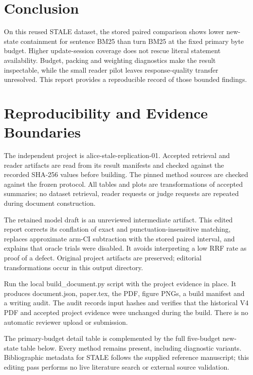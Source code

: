 \documentclass{article}
\begin{document}
\section{Conclusion}
On this reused STALE dataset, the stored paired comparison shows lower new-state containment for sentence BM25 than turn BM25 at the fixed primary byte budget. Higher update-session coverage does not rescue literal statement availability. Budget, packing and weighting diagnostics make the result inspectable, while the small reader pilot leaves response-quality transfer unresolved. This report provides a reproducible record of those bounded findings.

\appendix
\section{Reproducibility and Evidence Boundaries}
The independent project is alice-stale-replication-01. Accepted retrieval and reader artifacts are read from its result manifests and checked against the recorded SHA-256 values before building. The pinned method sources are checked against the frozen protocol. All tables and plots are transformations of accepted summaries; no dataset retrieval, reader requests or judge requests are repeated during document construction.

The retained model draft is an unreviewed intermediate artifact. This edited report corrects its conflation of exact and punctuation-insensitive matching, replaces approximate arm-CI subtraction with the stored paired interval, and explains that oracle trials were disabled. It avoids interpreting a low RRF rate as proof of a defect. Original project artifacts are preserved; editorial transformations occur in this output directory.

Run the local build\_document.py script with the project evidence in place. It produces document.json, paper.tex, the PDF, figure PNGs, a build manifest and a writing audit. The audit records input hashes and verifies that the historical V4 PDF and accepted project evidence were unchanged during the build. There is no automatic reviewer upload or submission.

The primary-budget detail table is complemented by the full five-budget new-state table below. Every method remains present, including diagnostic variants. Bibliographic metadata for STALE follows the supplied reference manuscript; this editing pass performs no live literature search or external source validation.
\end{document}
